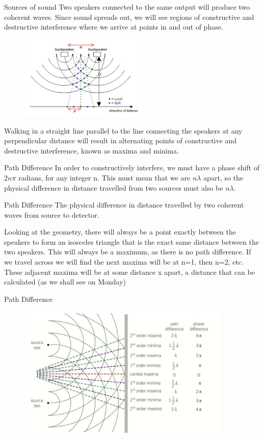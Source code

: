 \documentclass[../Main.tex]{subfiles}
\begin{document}
\begin{frame}{Sources of sound}
Two speakers connected to the same output will produce two coherent waves. Since sound spreads out, we will see regions of constructive and destructive interference where we arrive at points in and out of phase.
    \begin{figure}
        \centering
        \includegraphics[height=4cm]{Waves_Images/interferenceofsound.jpg}
    \end{figure}
    Walking in a straight line parallel to the line connecting the speakers at any perpendicular distance will result in alternating points of constructive and destructive interference, known as maxima and minima. 
\end{frame}

\begin{frame}{Path Difference}
    In order to constructively interfere, we must have a phase shift of $2n\pi$ radians, for any integer n. This must mean that we are $n\lambda$ apart, so the physical difference in distance travelled from two sources must also be $n\lambda$. 
    
    \begin{block}{Path Difference}
    The physical difference in distance travelled by two coherent waves from source to detector.
    \end{block}
    \pause
    
    Looking at the geometry, there will always be a point exactly between the speakers to form an isosceles triangle that is the exact same distance between the two speakers. This will always be a maximum, as there is no path difference. 
    \newline
    \pause
    \newline
    If we travel across we will find the next maxima will be at n=1, then n=2, etc. These adjacent maxima will be at some distance x apart, a distance that can be calculated (as we shall see on Monday)
\end{frame}

\begin{frame}{Path Difference}
    \begin{figure}
        \centering
        \includegraphics[width=0.9\textwidth]{Waves_Images/pathdifference.jpg}
    \end{figure}
\end{frame}
\end{document}
